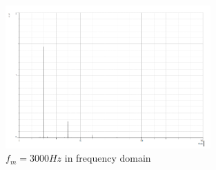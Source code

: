 \documentclass[12pt]{article}
\begin{document}
\begin{figure}[H]
    \centering
    \includegraphics[width=0.7\textwidth]{assets/p1.png}
    \caption{$f_m = 3000Hz$ in frequency domain}
\end{figure}
\end{document}
